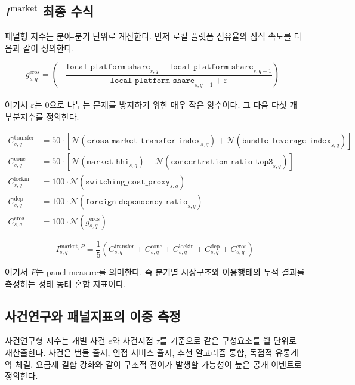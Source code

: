 \documentclass[11pt,a4paper]{report}
\begin{document}
\subsection{\texorpdfstring{$I^{\mathrm{market}}$ 최종 수식}{Imarket 최종 수식}}
패널형 지수는 분야-분기 단위로 계산한다. 먼저 로컬 플랫폼 점유율의 잠식 속도를 다음과 같이 정의한다.

\begin{equation}
\label{eq:imarket_erosion}
g^{\mathrm{eros}}_{s,q} = \left(-\frac{\texttt{local\_platform\_share}_{s,q}-\texttt{local\_platform\_share}_{s,q-1}}{\texttt{local\_platform\_share}_{s,q-1}+\varepsilon}\right)_+
\end{equation}

여기서 $\varepsilon$는 0으로 나누는 문제를 방지하기 위한 매우 작은 양수이다. 그 다음 다섯 개 부분지수를 정의한다.

\begin{align}
C^{\mathrm{transfer}}_{s,q} &= 50 \cdot \left[\mathcal{N}(\texttt{cross\_market\_transfer\_index}_{s,q}) + \mathcal{N}(\texttt{bundle\_leverage\_index}_{s,q})\right] \\
C^{\mathrm{conc}}_{s,q} &= 50 \cdot \left[\mathcal{N}(\texttt{market\_hhi}_{s,q}) + \mathcal{N}(\texttt{concentration\_ratio\_top3}_{s,q})\right] \\
C^{\mathrm{lockin}}_{s,q} &= 100 \cdot \mathcal{N}(\texttt{switching\_cost\_proxy}_{s,q}) \\
C^{\mathrm{dep}}_{s,q} &= 100 \cdot \mathcal{N}(\texttt{foreign\_dependency\_ratio}_{s,q}) \\
C^{\mathrm{eros}}_{s,q} &= 100 \cdot \mathcal{N}(g^{\mathrm{eros}}_{s,q}) \label{eq:imarket_component_scores}
\end{align}

\begin{equation}
\label{eq:imarket_panel}
I^{\mathrm{market},P}_{s,q} = \frac{1}{5}\left(C^{\mathrm{transfer}}_{s,q}+C^{\mathrm{conc}}_{s,q}+C^{\mathrm{lockin}}_{s,q}+C^{\mathrm{dep}}_{s,q}+C^{\mathrm{eros}}_{s,q}\right)
\end{equation}

여기서 $P$는 panel measure를 의미한다. 즉 분기별 시장구조와 이용행태의 누적 결과를 측정하는 정태-동태 혼합 지표이다.

\subsection{\texorpdfstring{사건연구와 패널지표의 이중 측정}{사건연구와 패널지표의 이중 측정}}
사건연구형 지수는 개별 사건 $e$와 사건시점 $\tau$를 기준으로 같은 구성요소를 월 단위로 재산출한다. 사건은 번들 출시, 인접 서비스 출시, 추천 알고리즘 통합, 독점적 유통계약 체결, 요금제 결합 강화와 같이 구조적 전이가 발생할 가능성이 높은 공개 이벤트로 정의한다.
\end{document}
